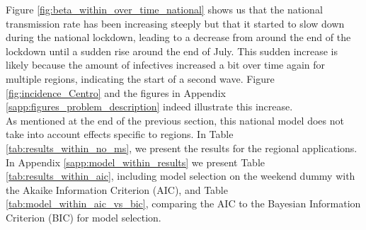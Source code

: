 \documentclass[12pt]{article}
\begin{document}
	Figure \ref{fig:beta_within_over_time_national} shows us that the national transmission rate has been increasing steeply but that it started to slow down during the national lockdown, leading to a decrease from around the end of the lockdown until a sudden rise around the end of July. This sudden increase is likely because the amount of infectives increased a bit over time again for multiple regions, indicating the start of a second wave. Figure \ref{fig:incidence_Centro} and the figures in Appendix \ref{sapp:figures_problem_description} indeed illustrate this increase.
	\\
	
	As mentioned at the end of the previous section, this national model does not take into account effects specific to regions. In Table \ref{tab:results_within_no_ms}, we present the results for the regional applications. In Appendix \ref{sapp:model_within_results} we present Table \ref{tab:results_within_aic}, including model selection on the weekend dummy with the Akaike Information Criterion (AIC), and Table \ref{tab:model_within_aic_vs_bic}, comparing the AIC to the Bayesian Information Criterion (BIC) for model selection.
	
	\newpage
	\setlength{\LTleft}{-20cm plus -1fill}
    \setlength{\LTright}{\LTleft}
	
\end{document}
